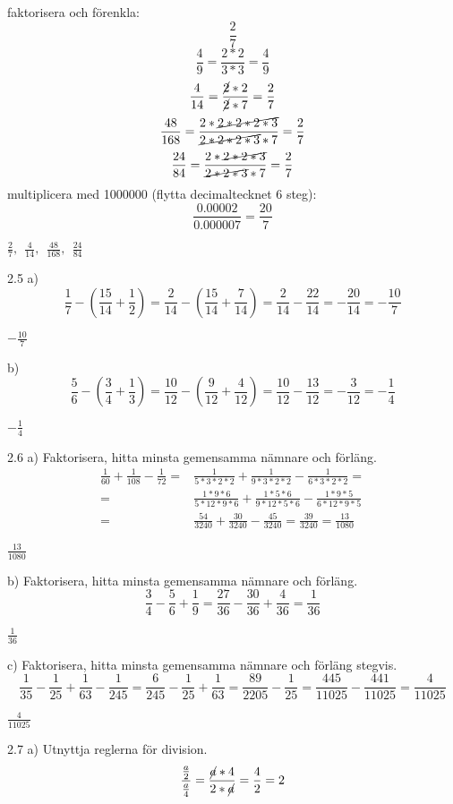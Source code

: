 \pagebreak
\begin{task}{2.4}
	faktorisera och förenkla:
	\[\dfrac{2}{7}\]
	\[\dfrac{4}{9}=\dfrac{2*2}{3*3}=\dfrac{4}{9}\]
	\[\dfrac{4}{14}=\dfrac{\cancel{2}*2}{\cancel{2}*7}=\dfrac{2}{7}\]
	\[\dfrac{48}{168}=\dfrac{2*\cancel{2*2*2*3}}{\cancel{2*2*2*3}*7}=\dfrac{2}{7}\]
	\[\dfrac{24}{84}=\dfrac{2*\cancel{2*2*3}}{\cancel{2*2*3}*7}=\dfrac{2}{7}\]
	multiplicera med 1000000 (flytta decimaltecknet 6 steg):
	\[\dfrac{0.00002}{0.000007}=\dfrac{20}{7}\]
	
	\ans $\frac{2}{7},~~ \frac{4}{14},~~ \frac{48}{168},~~ \frac{24}{84}$
\end{task}

\begin{task}{2.5 a)}
	\[\frac{1}{7}-\left(\frac{15}{14}+\frac{1}{2}\right)=\frac{2}{14}-\left(\frac{15}{14}+\frac{7}{14}\right)=\frac{2}{14}-\frac{22}{14}=-\frac{20}{14}=-\frac{10}{7}\]
	
	\ans $-\frac{10}{7}$
\end{task}

\begin{task}{b)}
	\[\frac{5}{6}-\left(\frac{3}{4}+\frac{1}{3}\right)=\frac{10}{12}-\left(\frac{9}{12}+\frac{4}{12}\right)=\frac{10}{12}-\frac{13}{12}=-\frac{3}{12}=-\frac{1}{4}\]
	
	\ans $-\frac{1}{4}$
\end{task}

\begin{task}{2.6 a)}
	Faktorisera, hitta minsta gemensamma nämnare och förläng.
	\begin{align*}
	\frac{1}{60}+\frac{1}{108}-\frac{1}{72}=&
	\frac{1}{5*3*2*2}+\frac{1}{9*3*2*2}-\frac{1}{6*3*2*2}= \\
	=&\frac{1*9*6}{5*12*9*6}+\frac{1*5*6}{9*12*5*6}-\frac{1*9*5}{6*12*9*5} \\
	=&\frac{54}{3240}+\frac{30}{3240}-\frac{45}{3240}=\frac{39}{3240}=\frac{13}{1080}
	\end{align*}
	
	\ans $\frac{13}{1080}$
\end{task}

\begin{task}{b)}
	Faktorisera, hitta minsta gemensamma nämnare och förläng.
	\[\frac{3}{4}-\frac{5}{6}+\frac{1}{9}=\frac{27}{36}-\frac{30}{36}+\frac{4}{36}=\frac{1}{36}\]
	
	\ans $\frac{1}{36}$
\end{task}

\begin{task}{c)}
	Faktorisera, hitta minsta gemensamma nämnare och förläng stegvis.
	\[\frac{1}{35}-\frac{1}{25}+\frac{1}{63}-\frac{1}{245}=
	\frac{6}{245}-\frac{1}{25}+\frac{1}{63}=
	\frac{89}{2205}-\frac{1}{25}=
	\frac{445}{11025}-\frac{441}{11025}=
	\frac{4}{11025}\]
	
	\ans $\frac{4}{11025}$
\end{task}

\begin{task}{2.7 a)}
	Utnyttja reglerna för division.
	\[\dfrac{\frac{a}{2}}{\frac{a}{4}}=
	\dfrac{\cancel{a}*4}{2*\cancel{a}}=
	\dfrac{4}{2}=
	2\]
	
\end{task}